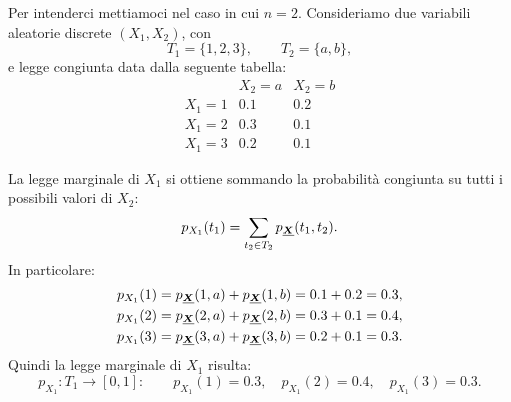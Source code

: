 \begin{esempio}
    Per intenderci mettiamoci nel caso in cui $n=2$. Consideriamo due variabili aleatorie discrete $(X_1, X_2)$, con
    \[
        T_1 = \{1,2,3\}, \qquad T_2 = \{a,b\},
    \]
    e legge congiunta data dalla seguente tabella:
    \[
    \begin{array}{c|cc}
        & X_2 = a & X_2 = b \\ \hline
        X_1 = 1 & 0.1 & 0.2 \\
        X_1 = 2 & 0.3 & 0.1 \\
        X_1 = 3 & 0.2 & 0.1
    \end{array}
    \]

    La legge marginale di $X_1$ si ottiene sommando la probabilità congiunta su tutti i possibili valori di $X_2$:
    \[
        p_{X_1}(t_1) = \sum_{t_2 \in T_2} p_{\underline{{\boldsymbol{X}}}}(t_1, t_2).
    \]
    In particolare:
    \[
    \begin{aligned}
        p_{X_1}(1) &= p_{\underline{{\boldsymbol{X}}}}(1,a) + p_{\underline{{\boldsymbol{X}}}}(1,b) = 0.1 + 0.2 = 0.3,\\
        p_{X_1}(2) &= p_{\underline{{\boldsymbol{X}}}}(2,a) + p_{\underline{{\boldsymbol{X}}}}(2,b) = 0.3 + 0.1 = 0.4,\\
        p_{X_1}(3) &= p_{\underline{{\boldsymbol{X}}}}(3,a) + p_{\underline{{\boldsymbol{X}}}}(3,b) = 0.2 + 0.1 = 0.3.
    \end{aligned}
    \]
    Quindi la legge marginale di $X_1$ risulta:
    \[
        p_{X_1} : T_1 \to [0,1]: \qquad
        p_{X_1}(1) = 0.3, \quad p_{X_1}(2) = 0.4, \quad p_{X_1}(3) = 0.3.
    \]
\end{esempio}
